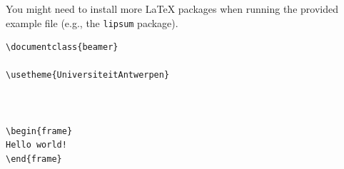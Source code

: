 \begin{note}
You might need to install more \LaTeX{} packages when running the provided example file (e.g., the \texttt{lipsum} package).
\end{note}

\begin{lstlisting}[float,caption={A minimalistic test file for the UA Beamer theme.},captionpos=b,label=listing:minex,abovecaptionskip=\bigskipamount]
\documentclass{beamer}

\usetheme{UniversiteitAntwerpen}



\begin{frame}
Hello world!
\end{frame}


\end{lstlisting}